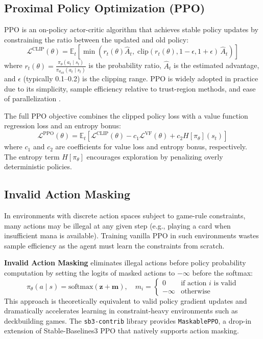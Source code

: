 \subsection{Proximal Policy Optimization (PPO)}

PPO \cite{schulman2017proximal} is an on-policy actor-critic algorithm that achieves stable policy updates by constraining the ratio between the updated and old policy:
\begin{equation}
\mathcal{L}^{\text{CLIP}}(\theta) = \mathbb{E}_t \left[ \min\!\left( r_t(\theta) \hat{A}_t,\; \text{clip}(r_t(\theta), 1-\epsilon, 1+\epsilon)\, \hat{A}_t \right) \right]
\label{eq:ppo_clip}
\end{equation}
where $r_t(\theta) = \frac{\pi_\theta(a_t \mid s_t)}{\pi_{\theta_\text{old}}(a_t \mid s_t)}$ is the probability ratio, $\hat{A}_t$ is the estimated advantage, and $\epsilon$ (typically 0.1--0.2) is the clipping range. PPO is widely adopted in practice due to its simplicity, sample efficiency relative to trust-region methods, and ease of parallelization \cite{schulman2017proximal}.

The full PPO objective combines the clipped policy loss with a value function regression loss and an entropy bonus:
\begin{equation}
\mathcal{L}^{\text{PPO}}(\theta) = \mathbb{E}_t \left[ \mathcal{L}^{\text{CLIP}}(\theta) - c_1 \mathcal{L}^{\text{VF}}(\theta) + c_2 H[\pi_\theta](s_t) \right]
\label{eq:ppo_full}
\end{equation}
where $c_1$ and $c_2$ are coefficients for value loss and entropy bonus, respectively. The entropy term $H[\pi_\theta]$ encourages exploration by penalizing overly deterministic policies.

\subsection{Invalid Action Masking}

In environments with discrete action spaces subject to game-rule constraints, many actions may be illegal at any given step (e.g., playing a card when insufficient mana is available). Training vanilla PPO in such environments wastes sample efficiency as the agent must learn the constraints from scratch.

\textbf{Invalid Action Masking} \cite{huang2020closer} eliminates illegal actions before policy probability computation by setting the logits of masked actions to $-\infty$ before the softmax:
\begin{equation}
\pi_\theta(a \mid s) = \text{softmax}\!\left( \mathbf{z} + \mathbf{m} \right),\quad m_i = \begin{cases} 0 & \text{if action } i \text{ is valid} \\ -\infty & \text{otherwise} \end{cases}
\end{equation}
This approach is theoretically equivalent to valid policy gradient updates \cite{huang2020closer} and dramatically accelerates learning in constraint-heavy environments such as deckbuilding games. The \texttt{sb3-contrib} library provides \texttt{MaskablePPO}, a drop-in extension of Stable-Baselines3 PPO that natively supports action masking.

